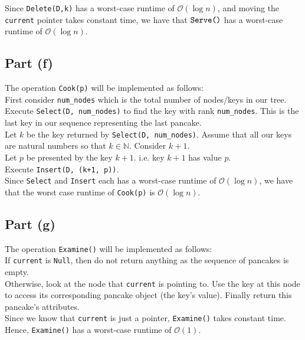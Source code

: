 \documentclass[12pt]{article}
\newcommand{\N}{\mathbb{N}}
\begin{document}
Since \verb|Delete(D,k)| has a worst-case runtime of $\mathcal{O}(\log n)$, and moving the \verb|current| pointer takes constant time, we have that $\verb|Serve()|$ has a worst-case runtime of $\mathcal{O}(\log n)$. 

\subsection*{Part (f)}

The operation \verb|Cook(p)| will be implemented as follows: \\

First consider \verb|num_nodes| which is the total number of nodes/keys in our tree. \\

Execute \verb|Select(D, num_nodes)| to find the key with rank \verb|num_nodes|. This is the last key in our sequence representing the last pancake. \\

Let $k$ be the key returned by \verb|Select(D, num_nodes)|. Assume that all our keys are natural numbers so that $k \in \N$. Consider $k+1$. \\

Let $p$ be presented by the key $k+1$. i.e. key $k+1$ has value $p$. \\

Execute \verb|Insert(D, (k+1, p))|. \\

Since \verb|Select| and \verb|Insert| each has a worst-case runtime of $\mathcal{O}(\log n)$, we have that the worst case runtime of \verb|Cook(p)| is $\mathcal{O}(\log n)$. 

\subsection*{Part (g)}

The operation \verb|Examine()| will be implemented as follows: \\

If \verb|current| is \verb|Null|, then do not return anything as the sequence of pancakes is empty. \\

Otherwise, look at the node that \verb|current| is pointing to. Use the key at this node to access its corresponding pancake object (the key's value). Finally return this pancake's attributes. \\

Since we know that \verb|current| is just a pointer, \verb|Examine()| takes constant time. \\

Hence, \verb|Examine()| has a worst-case runtime of $\mathcal{O}(1)$. 
\end{document}
